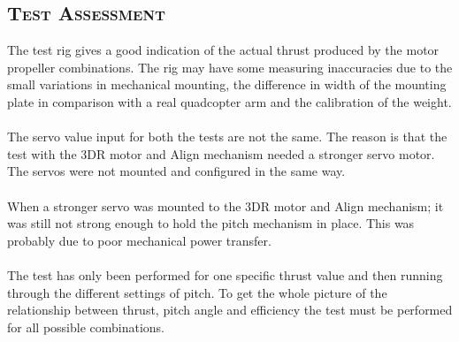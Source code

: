 \subsection*{\textsc{\medium Test Assessment}}
The test rig gives a good indication of the actual thrust produced by the motor propeller combinations. The rig may have some measuring inaccuracies due to the small variations in mechanical mounting, the difference in width of the mounting plate in comparison with a real quadcopter arm and the calibration of the weight.\\
\\
The servo value input for both the tests are not the same. The reason is that the test with the 3DR motor and Align mechanism needed a stronger servo motor. The servos were not mounted and configured in the same way.\\
\\
When a stronger servo was mounted to the 3DR motor and Align mechanism; it was still not strong enough to hold the pitch mechanism in place. This was probably due to poor mechanical power transfer.\\
\\
The test has only been performed for one specific thrust value and then running through the different settings of pitch. To get the whole picture of the relationship between thrust, pitch angle and efficiency the test must be performed for all possible combinations. 

\newpage
